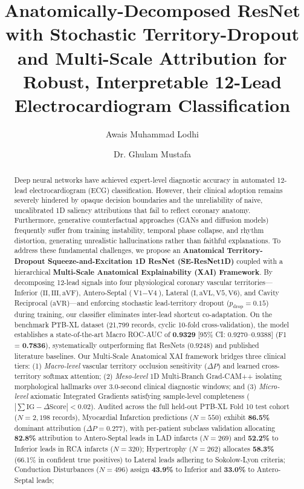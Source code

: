 \documentclass[12pt]{elsarticle}
\begin{document}
\begin{frontmatter}

\title{Anatomically-Decomposed ResNet with Stochastic Territory-Dropout and Multi-Scale Attribution for Robust, Interpretable 12-Lead Electrocardiogram Classification}

\author[1]{Awais Muhammad Lodhi}
\author[1]{Dr. Ghulam Mustafa}

\address[1]{Department of Computer Science, FOIT\&CS, UCP, Pakistan}

\begin{abstract}
Deep neural networks have achieved expert-level diagnostic accuracy in automated 12-lead electrocardiogram (ECG) classification. However, their clinical adoption remains severely hindered by opaque decision boundaries and the unreliability of naive, uncalibrated 1D saliency attributions that fail to reflect coronary anatomy. Furthermore, generative counterfactual approaches (GANs and diffusion models) frequently suffer from training instability, temporal phase collapse, and rhythm distortion, generating unrealistic hallucinations rather than faithful explanations. To address these fundamental challenges, we propose an \textbf{Anatomical Territory-Dropout Squeeze-and-Excitation 1D ResNet (SE-ResNet1D)} coupled with a hierarchical \textbf{Multi-Scale Anatomical Explainability (XAI) Framework}. By decomposing 12-lead signals into four physiological coronary vascular territories---Inferior ($\text{II}, \text{III}, \text{aVF}$), Antero-Septal ($\text{V1}-\text{V4}$), Lateral ($\text{I}, \text{aVL}, \text{V5}, \text{V6}$), and Cavity Reciprocal ($\text{aVR}$)---and enforcing stochastic lead-territory dropout ($p_{\text{drop}} = 0.15$) during training, our classifier eliminates inter-lead shortcut co-adaptation. On the benchmark PTB-XL dataset (21,799 records, cyclic 10-fold cross-validation), the model establishes a state-of-the-art Macro ROC-AUC of \textbf{0.9329} [95\% CI: 0.9270--0.9388] (F1 = \textbf{0.7836}), systematically outperforming flat ResNets ($0.9248$) and published literature baselines. Our Multi-Scale Anatomical XAI framework bridges three clinical tiers: (1) \textit{Macro-level} vascular territory occlusion sensitivity ($\Delta P$) and learned cross-territory softmax attention; (2) \textit{Meso-level} 1D Multi-Branch Grad-CAM++ isolating morphological hallmarks over 3.0-second clinical diagnostic windows; and (3) \textit{Micro-level} axiomatic Integrated Gradients satisfying sample-level completeness ($|\sum \text{IG} - \Delta \text{Score}| < 0.02$). Audited across the full held-out PTB-XL Fold 10 test cohort ($N = 2,198$ records), Myocardial Infarction predictions ($N=550$) exhibit \textbf{86.5\%} dominant attribution ($\Delta P = 0.277$), with per-patient subclass validation allocating \textbf{82.8\%} attribution to Antero-Septal leads in LAD infarcts ($N=269$) and \textbf{52.2\%} to Inferior leads in RCA infarcts ($N=320$); Hypertrophy ($N=262$) allocates \textbf{58.3\%} (66.1\% in confident true positives) to Lateral leads adhering to Sokolow-Lyon criteria; Conduction Disturbances ($N=496$) assign \textbf{43.9\%} to Inferior and \textbf{33.0\%} to Antero-Septal leads; 
\end{abstract}
\end{frontmatter}
\end{document}

